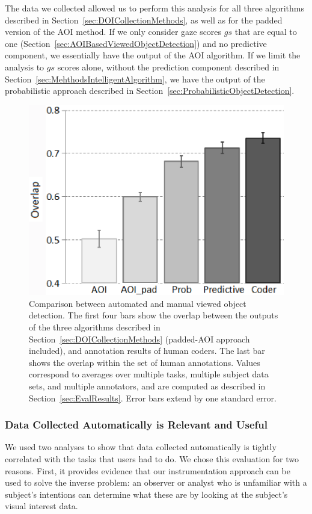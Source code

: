 The data we collected allowed us to perform this analysis for all three algorithms described in Section~\ref{sec:DOICollectionMethods}, as well as for the padded version of the AOI method. If we only consider gaze scores $gs$ that are equal to one (Section~\ref{sec:AOIBasedViewedObjectDetection}) and no predictive component, we essentially have the output of the AOI algorithm. If we limit the analysis to $gs$ scores alone, without the prediction component described in Section~\ref{sec:MehthodsIntelligentAlgorithm}, we have the output of the probabilistic approach described in Section~\ref{sec:ProbabilisticObjectDetection}.

\begin{figure}[htb]
  \centering
  \includegraphics[width=0.6\linewidth]{images/algosComparison.eps}
  \caption{Comparison between automated and manual viewed object detection.
The first four bars show the overlap between the outputs of
the three algorithms described in Section~\ref{sec:DOICollectionMethods} (padded-AOI approach included), and
annotation results of human coders. The last bar shows the overlap
within the set of human annotations. Values correspond to averages
over multiple tasks, multiple subject data sets, and multiple annotators,
and are computed as described in Section~\ref{sec:EvalResults}. Error bars
extend by one standard error. }
	\label{fig:quantitative}
\end{figure}


\subsubsection{Data Collected Automatically is Relevant and Useful}
\label{sec:EvalDataCollected}

We used two analyses to show that data collected automatically is tightly correlated with the tasks that users had to do. We chose this evaluation for two reasons. First, it provides evidence that our instrumentation approach can be used to solve the inverse problem: an observer or analyst who is unfamiliar with a subject's intentions can determine what these are by looking at the subject's visual interest data. 

